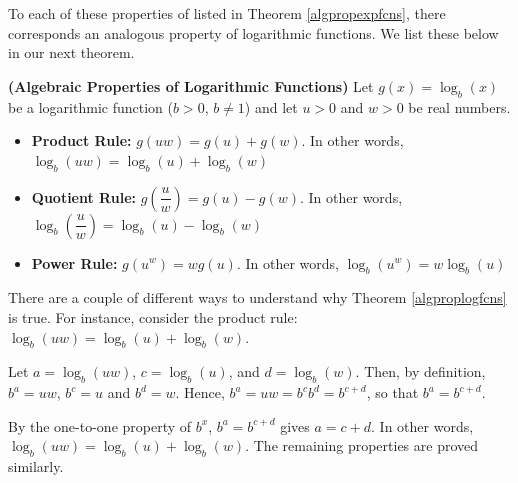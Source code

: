 \smallskip

 To each of these properties of listed in Theorem \ref{algpropexpfcns}, there corresponds an analogous property of logarithmic functions.  We list these below in our next theorem.

\smallskip

\colorbox{ResultColor}{\bbm

\begin{thm}  \label{algproplogfcns} \textbf{(Algebraic Properties of Logarithmic Functions)}  Let $g(x) =\log_{b}(x)$ be a logarithmic function ($b > 0$, $b\neq 1$) and let $u>0$ and $w>0$ be real numbers. 

\begin{itemize}

\item  \textbf{Product Rule:}  $g(uw) = g(u)+ g(w)$.  In other words, $\log_{b}(uw) = \log_{b}(u) + \log_{b}(w)$

\item  \textbf{Quotient Rule:}  $g\left(\dfrac{u}{w} \right) = g(u) - g(w)$.  In other words, $\log_{b} \left( \dfrac{u}{w} \right) = \log_{b}(u) - \log_{b}(w)$

\item  \textbf{Power Rule:}  $g\left(u^{w}\right) =w g(u)$.  In other words, $\log_{b}\left(u^{w}\right) = w \log_{b}(u)$

\end{itemize}

\end{thm}

\ebm}

\smallskip

There are a couple of different ways to understand why Theorem \ref{algproplogfcns} is true.  For instance, consider  the product rule: $\log_{b}(uw) = \log_{b}(u) + \log_{b}(w)$.  

\smallskip

Let $a = \log_{b}(uw)$, $c = \log_{b}(u)$, and $d = \log_{b}(w)$.  Then, by definition, $b^{a} = uw$, $b^{c} = u$ and $b^{d} = w$.  Hence, $b^{a} = uw = b^{c} b^{d} = b^{c+d}$, so that $b^{a} = b^{c+d}$. 

\smallskip

By the one-to-one property of $b^{x}$,  $b^{a} = b^{c+d}$ gives $a = c+d$. In other words, $\log_{b}(uw) = \log_{b}(u) + \log_{b}(w)$.  The remaining properties are proved similarly.  


